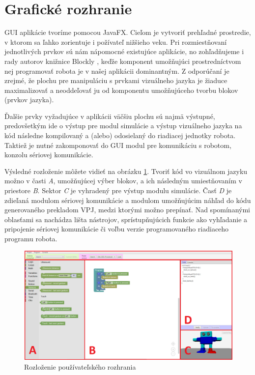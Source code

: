 \newpage

\section{Grafické rozhranie}
GUI aplikácie tvoríme pomocou JavaFX. Cieľom je vytvoriť prehľadné prostredie, v ktorom sa ľahko zorientuje i požívateľ nižšieho veku. Pri rozmiestňovaní jednotlivých prvkov sú nám nápomocné existujúce aplikácie, no zohľadňujeme i rady autorov knižnice Blockly \cite{blocklyBestPractices}, keďže komponent umožňujúci prostredníctvom nej programovať robota je v našej aplikácii dominantným. Z odporúčaní je zrejmé, že plochu pre manipuláciu s prvkami vizuálneho jazyka je žiaduce maximalizovať a neoddeľovať ju od komponentu umožňujúceho tvorbu blokov (prvkov jazyka).

Ďalšie prvky vyžadujúce v aplikácii väčšiu plochu sú najmä výstupné, predovšetkým ide o výstup pre modul simulácie a výstup  vizuálneho jazyka na kód následne kompilovaný a (alebo) odosielaný do riadiacej jednotky robota. Taktiež je nutné zakomponovať do GUI modul pre komunikáciu s robotom, konzolu sériovej komunikácie.

Výsledné rozloženie môžete vidieť na obrázku \ref{obr:gui-layout}. Tvoriť kód vo vizuálnom jazyku možno v časti \textit{A}, umožňujúcej výber blokov, a ich následným umiestňovaním v priestore \textit{B}. Sektor \textit{C} je vyhradený pre výstup modulu simulácie. Časť \textit{D} je zdieľaná modulom sériovej komunikácie a modulom umožňujúcim náhľad do kódu generovaného prekladom VPJ, medzi ktorými možno prepínať. Nad spomínanými oblasťami sa nachádza lišta nástrojov, sprístupňujúcich funkcie ako vyhľadanie a pripojenie sériovej komunikácie či voľbu verzie programovaného riadiaceho programu robota.

\begin{figure}
\centerline{\includegraphics[width=1\textwidth]{images/rozlozenie-gui}}
\caption[Rozloženie používateľského rozhrania]{Rozloženie používateľského rozhrania}
\label{obr:gui-layout}
\end{figure}


